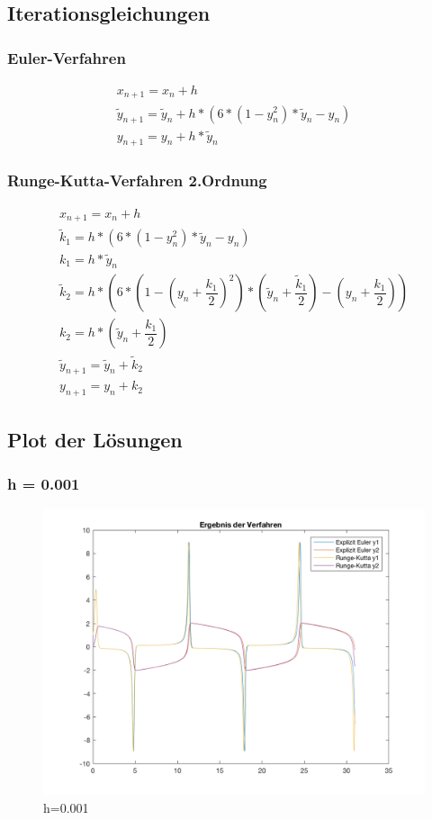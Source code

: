 \documentclass[]{scrartcl}
\begin{document}
\subsection{Iterationsgleichungen}

\subsubsection{Euler-Verfahren}
\begin{align}
x_{n+1} = x_{n}+h \\
\tilde{y}_{n+1} = \tilde{y}_{n}+h*(6 * (1 - y_{n}^{2}) * \tilde{y}_{n} - y_{n}) \\
y_{n+1} = y_{n} + h * \tilde{y}_{n}
\end{align}

\subsubsection{Runge-Kutta-Verfahren 2.Ordnung}
\begin{align}
x_{n+1} = x_{n}+h \\
\tilde{k}_{1} = h * (6 * (1 - y_{n}^{2}) * \tilde{y}_{n} - y_{n}) \\
k_{1} = h * \tilde{y}_{n} \\
\tilde{k}_{2} = h * (6 * (1 - (y_{n} + \dfrac{k_{1}}{2})^{2}) * (\tilde{y}_{n} + \dfrac{\tilde{k}_{1}}{2}) - (y_{n} + \dfrac{k_{1}}{2})) \\
k_{2} = h * (\tilde{y}_{n} + \dfrac{k_{1}}{2}) \\
\tilde{y}_{n+1} = \tilde{y}_{n}+\tilde{k}_{2} \\
y_{n+1} = y_{n}+k_{2}
\end{align}

\subsection{Plot der Lösungen}
\subsubsection{h = 0.001}
\begin{figure}[H]
\centering
\includegraphics[width=1\linewidth]{a1_2_1}
\caption{h=0.001}
\label{fig:a1_2_1}
\end{figure}
\end{document}
